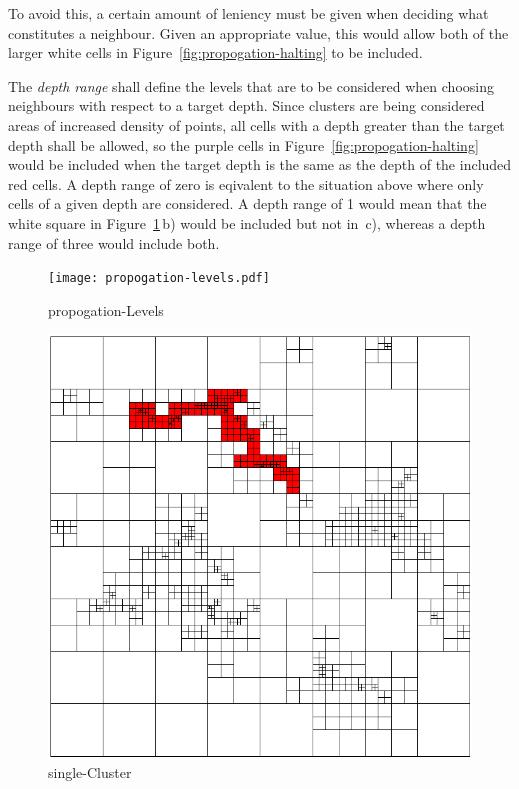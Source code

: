 To avoid this, a certain amount of leniency must be given when deciding what
constitutes a neighbour. Given an appropriate value, this would allow both of
the larger white cells in Figure~\ref{fig:propogation-halting} to be included.

The \emph{depth range} shall define the levels that are to be considered when
choosing neighbours with respect to a target depth. Since clusters are being
considered areas of increased density of points, all cells with a depth greater
than the target depth shall be allowed, so the purple cells in
Figure~\ref{fig:propogation-halting} would be included when the target depth is
the same as the depth of the included red cells. A depth range of zero is
eqivalent to the situation above where only cells of a given depth are
considered. A depth range of 1 would mean that the white square in
Figure~\ref{fig:propogation-levels}\,b) would be included but not in~c),
whereas a depth range of three would include both.

\begin{figure}[tbhp]
	\centering
	\texttt{[image: propogation-levels.pdf]}
	\caption{propogation-Levels}
	\label{fig:propogation-levels}
\end{figure}

\begin{figure}[tbhp]
	\centering
	\includegraphics[width=0.88\linewidth]{single-cluster.png}
	\caption{single-Cluster}
	\label{fig:single-cluster}
\end{figure}
